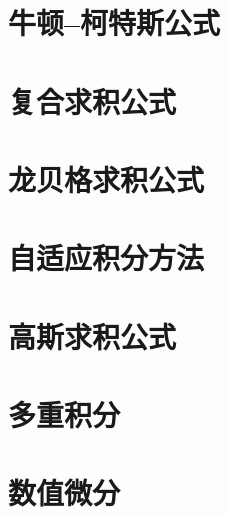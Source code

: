 \section{牛顿--柯特斯公式}
\section{复合求积公式}
\section{龙贝格求积公式}
\section{自适应积分方法}
\section{高斯求积公式}
\section{多重积分}
\section{数值微分}
